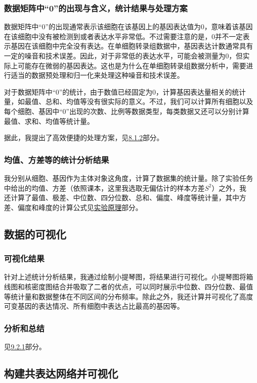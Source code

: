 \documentclass {article}
\begin{document}
		\subsubsection{数据矩阵中“0”的出现与含义，统计结果与处理方案}
			数据矩阵中“0”的出现通常表示该细胞在该基因上的基因表达值为0，意味着该基因在该细胞中没有被检测到或者表达水平非常低。不过需要注意的是，0并不一定表示基因在该细胞中完全没有表达。在单细胞转录组数据中，基因表达计数通常具有一定的噪音和技术误差。因此，对于非常低的表达水平，可能会被测量为0，但实际上可能存在微弱的基因表达。这也是为什么在单细胞转录组数据分析中，需要进行适当的数据预处理和归一化来处理这种噪音和技术误差。
		
			对于数据矩阵中“0”的统计，由于数值已经固定为0，计算基因表达量相关的统计量，如最值、总和、均值等没有很实际的意义。不过，我们可以计算所有细胞以及每个细胞、基因中“0”出现的次数、比例等数据类型，每类数据又还可以分别计算最值、求和、均值等统计量。
		
			据此，我提出了高效便捷的处理方案，见\hyperref[处理方案]{8.1.2}部分。
		
		\subsubsection{均值、方差等的统计分析结果}
			我分别从细胞、基因作为主体对象这角度，计算了数据集的统计量。除了实验任务中给出的均值、方差（依照课本，这里我选取无偏估计的样本方差$S^2$）之外，我还计算了最值、极差、中位数、四分位数、总和、偏度、峰度等统计量，其中方差、偏度和峰度的计算公式见\hyperref[实验原理]{实验原理}部分。
		
	\subsection{数据的可视化}
		\subsubsection{可视化结果}
			针对上述统计分析结果，我通过绘制小提琴图，将结果进行可视化。小提琴图将箱线图和核密度图结合并吸取了二者的优点，可以同时展示中位数、四分位数、最值等统计量和数据整体在不同区间的分布频率。除此之外，我还计算并可视化了高度可变基因的表达情况、所有细胞中表达占比最高的基因等。
		
		\subsubsection{分析和总结}
			见\hyperref[分析和总结]{9.2.1}部分。
		
	\subsection{构建共表达网络并可视化}
\end{document}
